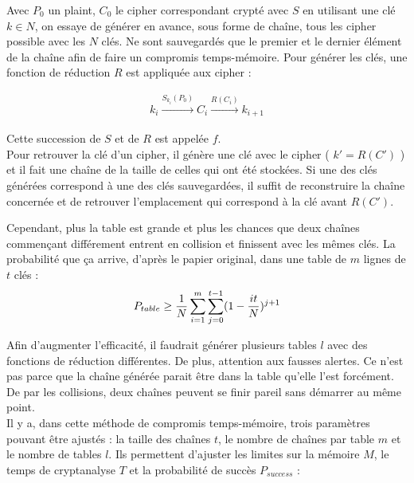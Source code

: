 
	Avec $P_0$ un \gls{plaint}, $C_0$ le \gls{cipher} correspondant crypté avec $S$ en utilisant une clé $k \in N$, on essaye de générer en avance, sous forme de chaîne, tous les \gls{cipher} possible avec les $N$ clés. Ne sont sauvegardés que le premier et le dernier élément de la chaîne afin de faire un compromis temps-mémoire. Pour générer les clés, une fonction de réduction $R$ est appliquée aux \gls{cipher} :

	\begin{align*}
		k_i \overset{S_{k_i}(P_0)}{\longrightarrow} C_i \overset{R(C_i)}{\longrightarrow} k_{i+1}
	\end{align*}

	Cette succession de $S$ et de $R$ est appelée $f$.\\

	Pour retrouver la clé d'un \gls{cipher}, il génère une clé avec le \gls{cipher} ( $k' = R(C')$ ) et il fait une chaîne de la taille de celles qui ont été stockées. Si une des clés générées correspond à une des clés sauvegardées, il suffit de reconstruire la chaîne concernée et de retrouver l'emplacement qui correspond à la clé avant $R(C')$.

	Cependant, plus la table est grande et plus les chances que deux chaînes commençant différement entrent en collision et finissent avec les mêmes clés. La probabilité que ça arrive, d'après le papier original\cite{ehellman}, dans une table de $m$ lignes de $t$ clés :\\

	\begin{align*}
		P_{table} \ge{} \frac{1}{N} \sum\limits_{i=1}^{m}\sum\limits_{j=0}^{t-1} (1 - \frac{it}{N})^{j+1}
	\end{align*}

	Afin d'augmenter l'efficacité, il faudrait générer plusieurs tables $l$ avec des fonctions de réduction différentes. De plus, attention aux fausses alertes. Ce n'est pas parce que la chaîne générée parait être dans la table qu'elle l'est forcément. De par les collisions, deux chaînes peuvent se finir pareil sans démarrer au même point.\\

	Il y a, dans cette méthode de compromis temps-mémoire, trois paramètres pouvant être ajustés : la taille des chaînes $t$, le nombre de chaînes par table $m$ et le nombre de tables $l$. Ils permettent d'ajuster les limites sur la mémoire $M$, le temps de cryptanalyse $T$ et la probabilité de succès $P_{success}$\cite{Oech03} :

